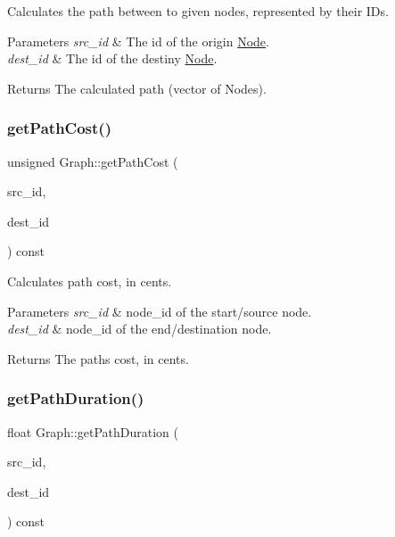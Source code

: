 Calculates the path between to given nodes, represented by their I\+Ds.


\begin{DoxyParams}{Parameters}
{\em src\+\_\+id} & The id of the origin \hyperlink{class_node}{Node}. \\
\hline
{\em dest\+\_\+id} & The id of the destiny \hyperlink{class_node}{Node}.\\
\hline
\end{DoxyParams}
\begin{DoxyReturn}{Returns}
The calculated path (vector of Nodes). 
\end{DoxyReturn}
\hypertarget{class_graph_a9d5ab1a266d948f146e78866ef19673d}{}\label{class_graph_a9d5ab1a266d948f146e78866ef19673d} 
\subsubsection{\texorpdfstring{get\+Path\+Cost()}{getPathCost()}}
{\footnotesize\ttfamily unsigned Graph\+::get\+Path\+Cost (\begin{DoxyParamCaption}\item[{\hyperlink{_node_8hpp_a9d6265804805c2375068fd7484840dc6}{node\+\_\+id}}]{src\+\_\+id,  }\item[{\hyperlink{_node_8hpp_a9d6265804805c2375068fd7484840dc6}{node\+\_\+id}}]{dest\+\_\+id }\end{DoxyParamCaption}) const}

Calculates path cost, in cents.


\begin{DoxyParams}{Parameters}
{\em src\+\_\+id} & node\+\_\+id of the start/source node. \\
\hline
{\em dest\+\_\+id} & node\+\_\+id of the end/destination node.\\
\hline
\end{DoxyParams}
\begin{DoxyReturn}{Returns}
The path\textquotesingle{}s cost, in cents. 
\end{DoxyReturn}
\hypertarget{class_graph_a2d69a99fb35fee10aadc243c468ad9b2}{}\label{class_graph_a2d69a99fb35fee10aadc243c468ad9b2} 
\subsubsection{\texorpdfstring{get\+Path\+Duration()}{getPathDuration()}}
{\footnotesize\ttfamily float Graph\+::get\+Path\+Duration (\begin{DoxyParamCaption}\item[{\hyperlink{_node_8hpp_a9d6265804805c2375068fd7484840dc6}{node\+\_\+id}}]{src\+\_\+id,  }\item[{\hyperlink{_node_8hpp_a9d6265804805c2375068fd7484840dc6}{node\+\_\+id}}]{dest\+\_\+id }\end{DoxyParamCaption}) const}


